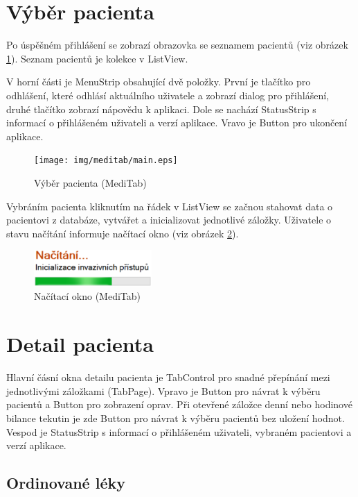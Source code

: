 \section{Výběr pacienta}

Po úspěšném přihlášení se zobrazí obrazovka se seznamem pacientů (viz obrázek \ref{fig:main}). Seznam pacientů je kolekce v ListView.

V horní části je MenuStrip obsahující dvě položky. První je tlačítko pro odhlášení, které odhlásí aktuálního uživatele a zobrazí dialog pro přihlášení, druhé tlačítko zobrazí nápovědu k aplikaci. Dole se nachází StatusStrip s informací o přihlášeném uživateli a verzí aplikace. Vravo je Button pro ukončení aplikace.

\begin{figure}[H]
	\centering
	\texttt{[image: img/meditab/main.eps]}
	\caption{Výběr pacienta (MediTab)}
  \label{fig:main}
\end{figure}


Vybráním pacienta kliknutím na řádek v ListView se začnou stahovat data o pacientovi z databáze, vytvářet a inicializovat jednotlivé záložky. Uživatele o stavu načítání informuje načítací okno (viz obrázek \ref{fig:load}).

\begin{figure}[H]
	\centering
	\includegraphics[width=0.4\textwidth]{img/meditab/loading.eps}
	\caption{Načítací okno (MediTab)}
  \label{fig:load}
\end{figure}



\section{Detail pacienta}

Hlavní čásní okna detailu pacienta je TabControl pro snadné přepínání mezi jednotlivými záložkami (TabPage). Vpravo je Button pro návrat k výběru pacientů a Button pro zobrazení oprav. Při otevřené záložce denní nebo hodinové bilance tekutin je zde Button pro návrat k výběru pacientů bez uložení hodnot. Vespod je StatusStrip s informací o přihlášeném uživateli, vybraném pacientovi a verzí aplikace.

\subsection{Ordinované léky}

